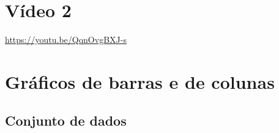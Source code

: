 \documentclass[
  11pt]{report}
\begin{document}
\hypertarget{vuxeddeo-2-3}{%
\section{Vídeo 2}\label{vuxeddeo-2-3}}

\begin{center} \url{https://youtu.be/QqnOvgBXJ-s} \end{center}

\hypertarget{gruxe1ficos-de-barras-e-de-colunas}{%
\section{Gráficos de barras e de colunas}\label{gruxe1ficos-de-barras-e-de-colunas}}

\hypertarget{conjunto-de-dados-2}{%
\subsection{Conjunto de dados}\label{conjunto-de-dados-2}}
\end{document}
